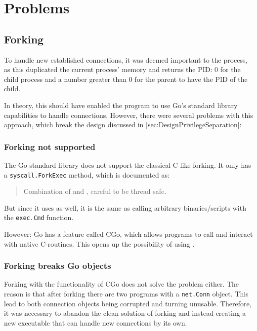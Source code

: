 \documentclass[10pt,a4paper,titlepage,twoside,english,final]{zhawreprt}
\begin{document}
\section{Problems}\label{sec:Problems}
\subsection{Forking}\label{ssec:Forking}
To handle new established connections, it was deemed important to \cite{fork} the process, as this duplicated the current process' memory and returns the \gls{PID}: 0 for the child process and a number greater than 0 for the parent to have the \gls{PID} of the child.

In theory, this should have enabled the program to use \gls{Go}'s standard library capabilities to handle connections.
However, there were several problems with this approach, which break the design discussed in \ref{sec:DesignPrivilegeSeparation}:

\subsubsection{Forking not supported}\label{sssec:ForkingNotSupported}
The \gls{Go} standard library does not support the classical \gls{C}-like forking.
It only has a \texttt{syscall.\linebreak{}ForkExec} method, which is documented as:
\begin{quote}
Combination of \cite{fork} and \cite{exec}, careful to be thread safe.
\end{quote}
But since it uses \cite{exec} as well, it is the same as calling arbitrary binaries/scripts with the \texttt{exec.Cmd} function.

However: \gls{Go} has a feature called \gls{CGo}, which allows programs to call and interact with native \gls{C}-routines.
This opens up the possibility of using \cite{fork}.

\subsubsection{Forking breaks Go objects}\label{sssec:ForkingBreaksGoObjects}
Forking with the functionality of \gls{CGo} does not solve the problem either.
The reason is that after forking there are two programs with a \texttt{net.Conn} object.
This lead to both connection objects being corrupted and turning unusable.
Therefore, it was necessary to abandon the clean solution of forking and instead creating a new executable that can handle new connections by its own.
\end{document}
